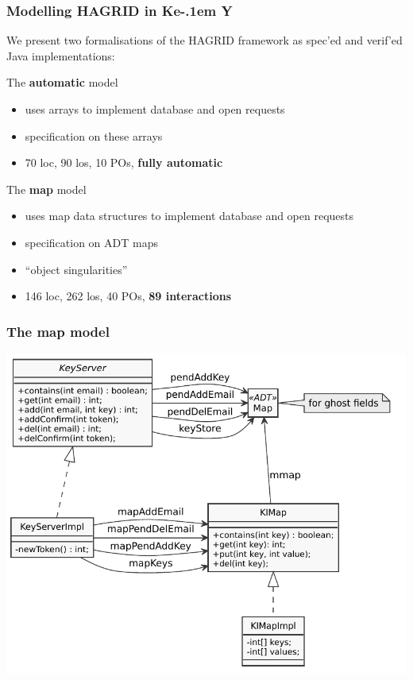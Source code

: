 \documentclass{beamer}
\newcommand{\KeY}{Ke\kern-.1em Y}
\begin{document}
\begin{frame}
  \frametitle{Modelling HAGRID in \KeY}

  We present two formalisations of the HAGRID framework as spec'ed and
  verif'ed Java implementations:
  \pause
  
  \begin{block}{The \textbf{automatic} model}
    \begin{itemize}
    \item uses arrays to implement database and open requests
    \item specification on these arrays
    \item 70 loc, 90 los, 10 POs, \textbf{fully automatic}
    \end{itemize}
  \end{block}

 
  \pause
  \begin{exampleblock}{The \textbf{map} model}
  \begin{itemize}
    \item uses map data structures to implement database and open requests
    \item specification on ADT maps
    \item ``object singularities''
    \item 146 loc, 262 los, 40 POs, \textbf{89 interactions}
    \end{itemize}
  \end{exampleblock}
  
\end{frame}

\begin{frame}
  \frametitle{The map model}
  \centering  \includegraphics[height=.9\textheight]{imap}
\end{frame}
\end{document}
